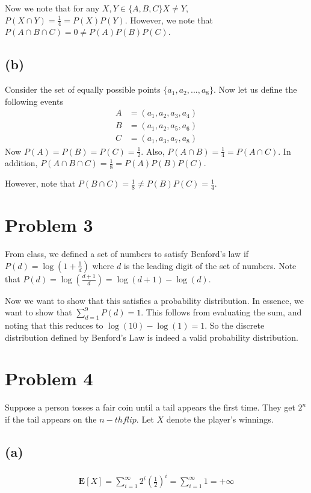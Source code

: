 \documentclass{article}
\begin{document}
	Now we note that for any $X, Y \in \{ A, B, C\} X \neq Y$, $P(X\cap Y) = \frac{1}{4} = P(X)P(Y)$. However, we note that $P(A \cap B \cap C) = 0 \neq P(A)P(B)P(C)$. 

	\subsection*{(b)}
	Consider the set of equally possible points $\{ a_1, a_2, ..., a_8 \}$. Now let us define the following events 
	\begin{align*}
	A &= (a_1, a_2, a_3, a_4) \\
	B &= (a_1, a_2, a_5, a_6) \\
	C &= (a_1, a_3, a_7, a_8) 
	\end{align*}
	Now $P(A) = P(B) = P(C) = \frac{1}{2}$. Also, $P(A \cap B) = \frac{1}{4} = P(A \cap C)$. In addition, $P(A \cap B \cap C) = \frac{1}{8} = P(A)P(B)P(C)$.
	
	However, note that $P(B \cap C) = \frac{1}{8} \neq P(B)P(C) = \frac{1}{4}$. 
	
	\section*{Problem 3}
	From class, we defined a set of numbers to satisfy Benford's law if $P(d) = \log(1 + \frac{1}{d})$ where $d$ is the leading digit of the set of numbers. Note that $P(d) = \log(\frac{d + 1}{d}) = \log(d+1) - \log(d)$. 
	
	Now we want to show that this satisfies a probability distribution. In essence, we want to show that $\sum_{d=1}^{9} P(d) = 1$. This follows from evaluating the sum, and noting that this reduces to $\log(10) - \log(1) = 1$. So the discrete distribution defined by Benford's Law is indeed a valid probability distribution.
	
	\section*{Problem 4}
	Suppose a person tosses a fair coin until a tail appears the first time. They get $2^n$ if the tail appears on the $n-th flip$. Let $X$ denote the player's winnings.
	
	\subsection*{(a)}
	\begin{align*}
	\mathbf{E}[X] = \sum_{i=1}^{\infty} 2^{i}(\frac{1}{2})^i = \sum_{i=1}^{\infty} 1 = + \infty
	\end{align*}
	
\end{document}
